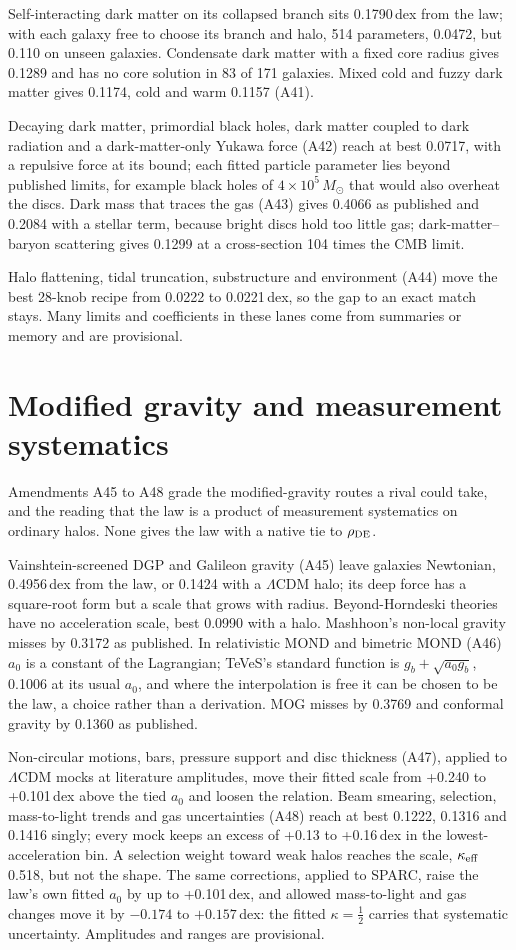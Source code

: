 \documentclass[11pt]{article}
\begin{document}
Self-interacting dark matter on its collapsed branch sits 0.1790\,dex from the law; with each galaxy free to choose its branch and halo, 514 parameters, 0.0472, but 0.110 on unseen galaxies. Condensate dark matter with a fixed core radius gives 0.1289 and has no core solution in 83 of 171 galaxies. Mixed cold and fuzzy dark matter gives 0.1174, cold and warm 0.1157 (A41).

Decaying dark matter, primordial black holes, dark matter coupled to dark radiation and a dark-matter-only Yukawa force (A42) reach at best 0.0717, with a repulsive force at its bound; each fitted particle parameter lies beyond published limits, for example black holes of $4\times10^5\,M_\odot$ that would also overheat the discs. Dark mass that traces the gas (A43) gives 0.4066 as published and 0.2084 with a stellar term, because bright discs hold too little gas; dark-matter--baryon scattering gives 0.1299 at a cross-section 104 times the CMB limit.

Halo flattening, tidal truncation, substructure and environment (A44) move the best 28-knob recipe from 0.0222 to 0.0221\,dex, so the gap to an exact match stays. Many limits and coefficients in these lanes come from summaries or memory and are provisional.

\section{Modified gravity and measurement systematics}
Amendments A45 to A48 grade the modified-gravity routes a rival could take, and the reading that the law is a product of measurement systematics on ordinary halos. None gives the law with a native tie to $\rho_{\rm DE}$.

Vainshtein-screened DGP and Galileon gravity (A45) leave galaxies Newtonian, 0.4956\,dex from the law, or 0.1424 with a $\Lambda$CDM halo; its deep force has a square-root form but a scale that grows with radius. Beyond-Horndeski theories have no acceleration scale, best 0.0990 with a halo. Mashhoon's non-local gravity misses by 0.3172 as published. In relativistic MOND and bimetric MOND (A46) $a_0$ is a constant of the Lagrangian; TeVeS's standard function is $g_b+\sqrt{a_0 g_b}$, 0.1006 at its usual $a_0$, and where the interpolation is free it can be chosen to be the law, a choice rather than a derivation. MOG misses by 0.3769 and conformal gravity by 0.1360 as published.

Non-circular motions, bars, pressure support and disc thickness (A47), applied to $\Lambda$CDM mocks at literature amplitudes, move their fitted scale from +0.240 to +0.101\,dex above the tied $a_0$ and loosen the relation. Beam smearing, selection, mass-to-light trends and gas uncertainties (A48) reach at best 0.1222, 0.1316 and 0.1416 singly; every mock keeps an excess of +0.13 to +0.16\,dex in the lowest-acceleration bin. A selection weight toward weak halos reaches the scale, $\kappa_{\rm eff}$ 0.518, but not the shape. The same corrections, applied to SPARC, raise the law's own fitted $a_0$ by up to +0.101\,dex, and allowed mass-to-light and gas changes move it by $-0.174$ to $+0.157$\,dex: the fitted $\kappa=\tfrac12$ carries that systematic uncertainty. Amplitudes and ranges are provisional.
\end{document}
